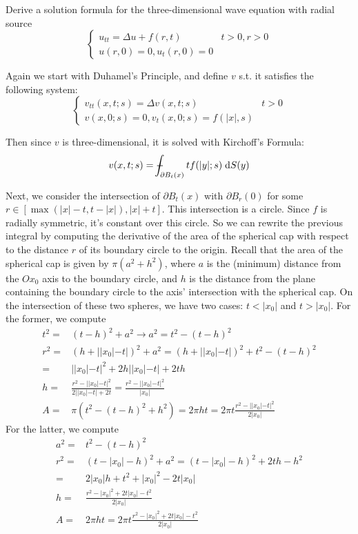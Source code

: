 Derive a solution formula for the three-dimensional wave equation with radial source
$$
\begin{cases}
  u_{tt} = \Delta u + f(r, t) & t > 0, r > 0\\
  u(r, 0) = 0, u_t(r, 0) = 0
\end{cases}
$$

Again we start with Duhamel's Principle, and define $v$ s.t. it satisfies the following system:
$$
\begin{cases}
  v_{tt}(x, t; s) = \Delta v(x, t; s) & t > 0\\
  v(x, 0; s) = 0, v_t(x, 0; s) = f(|x|, s)
\end{cases}
$$

Then since $v$ is three-dimensional, it is solved with Kirchoff's Formula:
$$
v(x, t; s) = \avgint_{\partial B_t(x)} t f(|y|; s) \dd{S(y)}
$$

Next, we consider the intersection of $\partial B_t(x)$ with $\partial B_r(0)$ for some $r \in [\max(|x| - t, t - |x|), |x| + t]$.
This intersection is a circle.
Since $f$ is radially symmetric, it's constant over this circle.
So we can rewrite the previous integral by computing the derivative of the area of the spherical cap
with respect to the distance $r$ of its boundary circle to the origin.
Recall that the area of the spherical cap is given by $\pi (a^2 + h^2)$,
where $a$ is the (minimum) distance from the $Ox_0$ axis to the boundary circle,
and $h$ is the distance from the plane containing the boundary circle to the axis' intersection with the spherical cap.
On the intersection of these two spheres, we have two cases: $t < |x_0|$ and $t > |x_0|$.
For the former, we compute
\begin{align*}
  t^2 = &(t - h)^2 + a^2 \rightarrow a^2 = t^2 - (t - h)^2\\
  r^2 = &(h + ||x_0| - t|)^2 + a^2 = (h + ||x_0| - t|)^2 + t^2 - (t - h)^2\\
      = &||x_0| - t|^2 + 2 h ||x_0| - t| + 2 t h\\
  h = &\frac{r^2 - ||x_0| - t|^2}{2 ||x_0| - t| + 2 t} = \frac{r^2 - ||x_0| - t|^2}{|x_0|}\\
  A = &\pi (t^2 - (t - h)^2 + h^2) = 2 \pi h t = 2 \pi t \frac{r^2 - ||x_0| - t|^2}{2 |x_0|}
\end{align*}
For the latter, we compute
\begin{align*}
  a^2 = &t^2 - (t - h)^2\\
  r^2 = &(t - |x_0| - h)^2 + a^2 = (t - |x_0| - h)^2 + 2 t h - h^2\\
      = &2 |x_0| h + t^2 + |x_0|^2 - 2 t |x_0|\\
  h = &\frac{r^2 - |x_0|^2 + 2 t |x_0| - t^2}{2 |x_0|}\\
  A = &2 \pi h t = 2 \pi t \frac{r^2 - |x_0|^2 + 2 t |x_0| - t^2}{2 |x_0|}
\end{align*}

